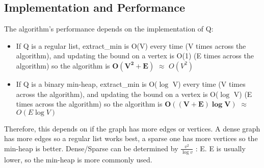 \subsection{Implementation and Performance}
The algorithm's performance depends on the implementation of Q:
\begin{itemize}
    \item If Q is a regular list, extract\_min is O(V) every time (V times across the algorithm), and updating the bound on a vertex is O(1) (E times across the algorithm) so the algorithm is $\boldsymbol{O(V^2 + E)}$ $\approx$ $O(V^2)$
    \item If Q is a binary min-heap, extract\_min is O($\log$ V) every time (V times across the algorithm), and updating the bound on a vertex is O($\log$ V) (E times across the algorithm) so the algorithm is $\boldsymbol{O((V+E)\log V)}$ $\approx$ $O(E \log V)$
\end{itemize}
Therefore, this depends on if the graph has more edges or vertices. A dense graph has more edges so a regular list works best, a sparse one has more vertices so the min-heap is better. Dense/Sparse can be determined by $\frac{v^2}{\log v}$ : E. E is usually lower, so the min-heap is more commonly used.